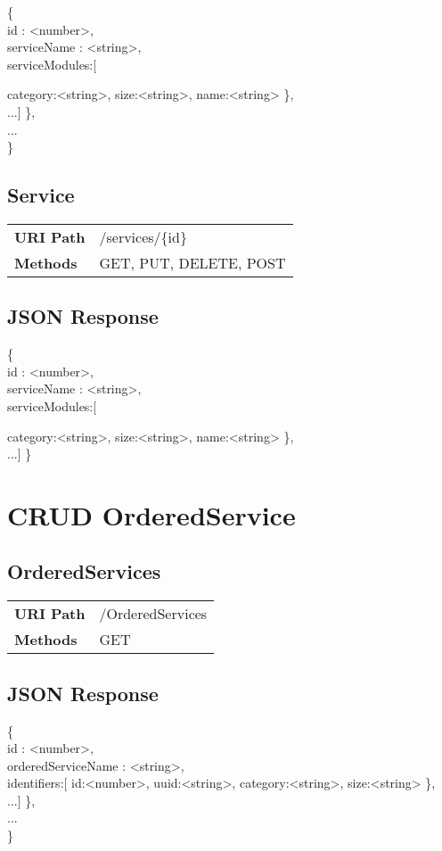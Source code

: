 \{\\
id : <number>,\\
serviceName : <string>,\\
serviceModules:[{
category:<string>,
size:<string>,
name:<string>
\}, \\ 
...]
\},\\
...\\
\}\\

\subsection{Service}


\begin{tabularx}{\linewidth}{l l}
\textbf{URI Path} & /services/\{id\}\\
\textbf{Methods} & GET, PUT, DELETE, POST\\
\end{tabularx}

\subsection{JSON Response}
\{\\
id : <number>,\\
serviceName : <string>,\\
serviceModules:[{
category:<string>,
size:<string>,
name:<string>
\}, \\ 
...]
\}

\section{CRUD OrderedService}
\subsection{OrderedServices}
\begin{tabularx}{\linewidth}{l l}
\textbf{URI Path} & /OrderedServices\\
\textbf{Methods} & GET\\
\end{tabularx}

\subsection{JSON Response}
\{\\
id : <number>,\\
orderedServiceName : <string>,\\
identifiers:[{
id:<number>,
uuid:<string>,
category:<string>,
size:<string>
\}, \\ 
...]
\},\\
...\\
\}\\


}}}
